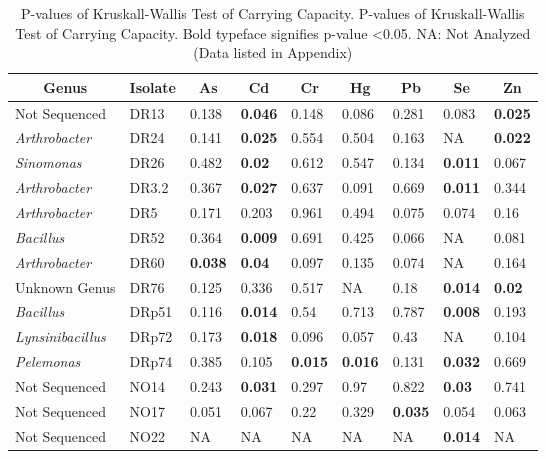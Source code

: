 \documentclass[ms, hidelinks]{uncgdissertationexp3}
\theoremstyle{plain}
\theoremstyle{definition}
\theoremstyle{remark}
\newcommand{\titlecaption}[2]{\caption[#1]{#1. #2}}
\begin{document}
\clearpage
\begin{table}[htbp]
  \titlecaption{P-values of Kruskall-Wallis Test of Carrying Capacity}{P-values of Kruskall-Wallis Test of Carrying Capacity. Bold typeface signifies p-value <0.05. NA: Not Analyzed (Data listed in Appendix)}
  \label{tab:kpvalue}
  \centering
  \begin{tabular}{lllllllll}
  \toprule
  \multicolumn{1}{c}{Genus} & \multicolumn{1}{c}{Isolate} & \multicolumn{1}{c}{As} & \multicolumn{1}{c}{Cd} & \multicolumn{1}{c}{Cr} & \multicolumn{1}{c}{Hg} & \multicolumn{1}{c}{Pb} & \multicolumn{1}{c}{Se} & \multicolumn{1}{c}{Zn}\\
  \midrule
  \rowcolor{gray!6}  Not Sequenced & DR13 & 0.138 & \textbf{0.046} & 0.148 & 0.086 & 0.281 & 0.083 & \textbf{0.025}\\
  \em{Arthrobacter} & DR24 & 0.141 & \textbf{0.025} & 0.554 & 0.504 & 0.163 & NA & \textbf{0.022}\\
  \rowcolor{gray!6}  \em{Sinomonas} & DR26 & 0.482 & \textbf{0.02} & 0.612 & 0.547 & 0.134 & \textbf{0.011} & 0.067\\
  \em{Arthrobacter} & DR3.2 & 0.367 & \textbf{0.027} & 0.637 & 0.091 & 0.669 & \textbf{0.011} & 0.344\\
  \rowcolor{gray!6}  \em{Arthrobacter} & DR5 & 0.171 & 0.203 & 0.961 & 0.494 & 0.075 & 0.074 & 0.16\\
  \em{Bacillus} & DR52 & 0.364 & \textbf{0.009} & 0.691 & 0.425 & 0.066 & NA & 0.081\\
  \rowcolor{gray!6}  \em{Arthrobacter} & DR60 & \textbf{0.038} & \textbf{0.04} & 0.097 & 0.135 & 0.074 & NA & 0.164\\
  Unknown Genus & DR76 & 0.125 & 0.336 & 0.517 & NA & 0.18 & \textbf{0.014} & \textbf{0.02}\\
  \rowcolor{gray!6}  \em{Bacillus} & DRp51 & 0.116 & \textbf{0.014} & 0.54 & 0.713 & 0.787 & \textbf{0.008} & 0.193\\
  \em{Lynsinibacillus} & DRp72 & 0.173 & \textbf{0.018} & 0.096 & 0.057 & 0.43 & NA & 0.104\\
  \rowcolor{gray!6}  \em{Pelemonas} & DRp74 & 0.385 & 0.105 & \textbf{0.015} & \textbf{0.016} & 0.131 & \textbf{0.032} & 0.669\\
  Not Sequenced & NO14 & 0.243 & \textbf{0.031} & 0.297 & 0.97 & 0.822 & \textbf{0.03} & 0.741\\
  \rowcolor{gray!6}  Not Sequenced & NO17 & 0.051 & 0.067 & 0.22 & 0.329 & \textbf{0.035} & 0.054 & 0.063\\
  Not Sequenced & NO22 & NA & NA & NA & NA & NA & \textbf{0.014} & NA\\
  \bottomrule
  \end{tabular}
\end{table}
\end{document}
